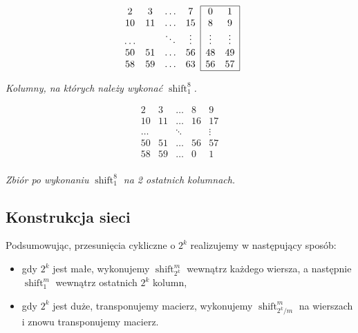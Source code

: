 \documentclass[a4paper]{article}
\newcommand{\shift}[2]{\operatorname{shift}_{#2}^{#1}}
\theoremstyle{definition}
\begin{document}
\begin{minipage}{.5\textwidth} %

\[
\begin{array}{c c  c c}
 2  &  3 & \ldots & 7 \\
 10 & 11 & \ldots & 15 \\
\ldots & & \ddots &  \vdots \\
 50 & 51 & \ldots & 56  \\
 58 & 59 & \ldots & 63  \\ 
\end{array}
\begin{array}{| c c |}
\hline
 0 &  1 \\
 8 &  9 \\
\vdots & \vdots \\
 48 & 49 \\
 56 & 57 \\
 \hline
\end{array}
\]

\begin{center} \it
    Kolumny, na których należy wykonać \(\shift 8 1\).
\end{center}
\end{minipage}
\begin{minipage}{.5\textwidth} %

\[
\begin{matrix}
 2  &  3 & \ldots & 8  &  9  \\
 10 & 11 & \ldots & 16 & 17\\
\ldots & & \ddots &  & \vdots \\
 50 & 51 & \ldots & 56 & 57 \\
 58 & 59 & \ldots & 0 &  1 \\ 
\end{matrix}
\]

\begin{center} \it
    Zbiór po wykonaniu \(\shift 8 1\) na 2 ostatnich kolumnach.
\end{center}
\end{minipage}


\subsection{Konstrukcja sieci}

Podsumowując, przesunięcia cykliczne o \(2^k\) realizujemy w następujący sposób:

\begin{itemize}
    \item gdy \(2^k\) jest małe, wykonujemy \(\shift{m}{2^k}\) wewnątrz każdego wiersza, a następnie \(\shift{m}{1}\) wewnątrz ostatnich \(2^k\) kolumn,
    \item gdy \(2^k\) jest duże, transponujemy macierz, wykonujemy \(\shift {m} {2^k/m} \) na wierszach i znowu transponujemy macierz.
\end{itemize}
\end{document}
